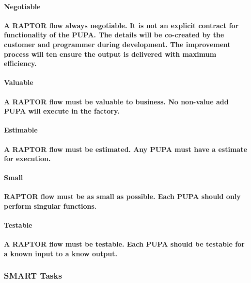 \documentclass{acm_proc_article-sp}
\begin{document}
\paragraph{\textbf{Negotiable}}
\paragraph{A RAPTOR flow always negotiable. It is not an explicit contract for functionality of the PUPA. The details will be co-created by the customer and programmer during development. The improvement process will ten ensure the output is delivered with maximum efficiency.}
\paragraph{\textbf{Valuable}}
\paragraph{A RAPTOR flow must be valuable to business. No non-value add PUPA will execute in the factory.}
\paragraph{\textbf{Estimable}}
\paragraph{A RAPTOR flow must be estimated. Any PUPA must have a estimate for execution.}
\paragraph{\textbf{Small}}
\paragraph{RAPTOR flow must be as small as possible. Each PUPA should only perform singular functions.}
\paragraph{\textbf{Testable}}
\paragraph{A RAPTOR flow must be testable. Each PUPA should be testable for a known input to a know output.}
\subsubsection{SMART Tasks}
\end{document}
